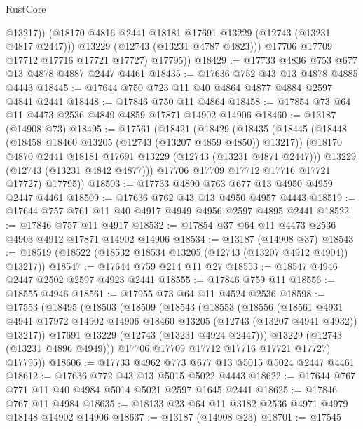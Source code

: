 \begin{lexlean}{RustCore}
\begin{coremodule}
                @13217))
            (@18170 @4816 @2441 @18181 @17691 @13229 (@12743 (@13231 @4817 @2447)))
            @13229
            (@12743 (@13231 @4787 @4823)))
          @17706
          @17709
          @17712
          @17716
          @17721
          @17727)
        @17795))
@18429 := @17733 @4836 @753 @677 @13 @4878 @4887 @2447 @4461
@18435 := @17636 @752 @43 @13 @4878 @4885 @4443
@18445 := @17644 @750 @723 @11 @40 @4864 @4877 @4884 @2597 @4841 @2441
@18448 := @17846 @750 @11 @4864
@18458 := @17854 @73 @64 @11 @4473 @2536 @4849 @4859 @17871 @14902 @14906
@18460 := @13187 (@14908 @73)
@18495 := @17561
    (@18421
      (@18429
        (@18435
          (@18445
            (@18448 (@18458 @18460 @13205 (@12743 (@13207 @4859 @4850)) @13217))
            (@18170 @4870 @2441 @18181 @17691 @13229 (@12743 (@13231 @4871 @2447)))
            @13229
            (@12743 (@13231 @4842 @4877)))
          @17706
          @17709
          @17712
          @17716
          @17721
          @17727)
        @17795))
@18503 := @17733 @4890 @763 @677 @13 @4950 @4959 @2447 @4461
@18509 := @17636 @762 @43 @13 @4950 @4957 @4443
@18519 := @17644 @757 @761 @11 @40 @4917 @4949 @4956 @2597 @4895 @2441
@18522 := @17846 @757 @11 @4917
@18532 := @17854 @37 @64 @11 @4473 @2536 @4903 @4912 @17871 @14902 @14906
@18534 := @13187 (@14908 @37)
@18543 := @18519 (@18522 (@18532 @18534 @13205 (@12743 (@13207 @4912 @4904)) @13217))
@18547 := @17644 @759 @214 @11 @27
@18553 := @18547 @4946 @2447 @2502 @2597 @4923 @2441
@18555 := @17846 @759 @11
@18556 := @18555 @4946
@18561 := @17955 @73 @64 @11 @4524 @2536
@18598 := @17553
    (@18495
      (@18503
        (@18509
          (@18543
            (@18553
              (@18556
                (@18561
                  @4931
                  @4941
                  @17972
                  @14902
                  @14906
                  @18460
                  @13205
                  (@12743 (@13207 @4941 @4932))
                  @13217))
              @17691
              @13229
              (@12743 (@13231 @4924 @2447)))
            @13229
            (@12743 (@13231 @4896 @4949)))
          @17706
          @17709
          @17712
          @17716
          @17721
          @17727)
        @17795))
@18606 := @17733 @4962 @773 @677 @13 @5015 @5024 @2447 @4461
@18612 := @17636 @772 @43 @13 @5015 @5022 @4443
@18622 := @17644 @767 @771 @11 @40 @4984 @5014 @5021 @2597 @1645 @2441
@18625 := @17846 @767 @11 @4984
@18635 := @18133 @23 @64 @11 @3182 @2536 @4971 @4979 @18148 @14902 @14906
@18637 := @13187 (@14908 @23)
@18701 := @17545

\end{coremodule}
\end{lexlean}
